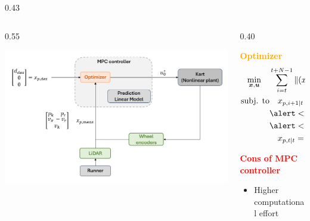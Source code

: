 \documentclass[9pt, aspectratio=169]{beamer}
\begin{document}
\begin{frame}
\begin{columns}
\begin{column}{0.43\textwidth}
\begin{block}{}
\begin{itemize}
\end{itemize}
\end{block}
\end{column}

\end{columns}

\vspace{0.1cm}
\begin{columns}
\begin{column}{0.55\textwidth}
	\begin{center}
  		\includegraphics[width=1\textwidth]{MPC_scheme} 
	\end{center}
\end{column}

\begin{column}{0.40\textwidth}
\begin{block}{}
\centering
\textcolor{orange}{\textbf{Optimizer}} 
\begin{equation*}
\begin{alignedat}{2}
	\min_{\substack{\boldsymbol{x}, \boldsymbol{u}}}\quad &\sum_{i=t}^{t+N-1} \|(x_{p,i|t} - x_{p,\text{des}})\|_Q \, +  \|u_{i|t}\|_R &&   \\
	\text{subj. to} & \quad x_{p,i+1|t}  = A_p \, x_{p,i|t} + B_p \, u_{i|t} + a_t  && \\
    &\alert<4>{\quad a_{\text{min}} \leq u_{i|t} \leq a_{\text{max}}} && \\
    &\alert<5>{\quad d_{\text{safe}}\leq \Delta p_{i|t}} &&  \\
    &\quad x_{p,t|t} = x_{p,\text{meas}} &&
\end{alignedat}
\end{equation*}
\end{block}
\begin{block}{}
\centering
\textcolor{red}{\textbf{Cons of MPC controller}}
\begin{itemize}
\footnotesize
	\item[$\blacktriangleright$] Higher computational effort
\end{itemize}
\end{block}
\end{column}
\end{columns}
\end{frame}
\end{document}
